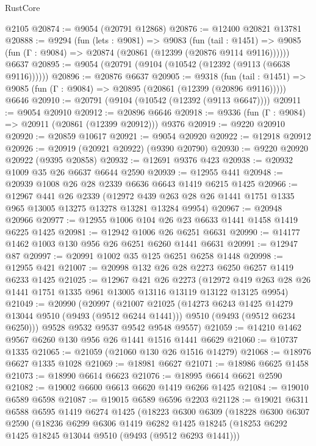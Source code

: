 \begin{lexlean}{RustCore}
\begin{coremodule}
    @2105
@20874 := @9054 (@20791 @12868)
@20876 := @12400 @20821 @13781
@20888 := @9294
    (fun (lets : @9081) =>
    @9083
      (fun (tail : @1451) =>
      @9085 (fun (Γ : @9084) => @20874 (@20861 (@12399 (@20876 @9114 @9116))))))
    @6637
@20895 := @9054 (@20791 (@9104 (@10542 (@12392 (@9113 (@6638 @9116))))))
@20896 := @20876 @6637
@20905 := @9318
    (fun (tail : @1451) => @9085 (fun (Γ : @9084) => @20895 (@20861 (@12399 (@20896 @9116)))))
    @6646
@20910 := @20791 (@9104 (@10542 (@12392 (@9113 @6647))))
@20911 := @9054 @20910
@20912 := @20896 @6646
@20918 := @9336 (fun (Γ : @9084) => @20911 (@20861 (@12399 @20912))) @9376
@20919 := @9220 @20910
@20920 := @20859 @10617
@20921 := @9054 @20920
@20922 := @12918 @20912
@20926 := @20919 (@20921 @20922) (@9390 @20790)
@20930 := @9220 @20920 @20922 (@9395 @20858)
@20932 := @12691 @9376 @423
@20938 := @20932 @1009 @35 @26 @6637 @6644 @2590
@20939 := @12955 @441
@20948 := @20939 @1008 @26 @28 @2339 @6636 @6643 @1419 @6215 @1425
@20966 := @12967
    @441
    @26
    @2339
    (@12972 @439 @263 @28 @26 @1441 @1751 @1335 @965 @13005 @13275 @13278 @13281 @13284 @9954)
@20967 := @20948 @20966
@20977 := @12955 @1006 @104 @26 @23 @6633 @1441 @1458 @1419 @6225 @1425
@20981 := @12942 @1006 @26 @6251 @6631
@20990 := @14177 @1462 @1003 @130 @956 @26 @6251 @6260 @1441 @6631
@20991 := @12947 @87
@20997 := @20991 @1002 @35 @125 @6251 @6258 @1448
@20998 := @12955 @421
@21007 := @20998 @132 @26 @28 @2273 @6250 @6257 @1419 @6233 @1425
@21025 := @12967
    @421
    @26
    @2273
    (@12972 @419 @263 @28 @26 @1441 @1751 @1335 @961 @13005 @13116 @13119 @13122 @13125 @9954)
@21049 := @20990
    (@20997
      (@21007
        @21025
        (@14273 @6243 @1425 @14279 @13044 @9510 (@9493 (@9512 @6244 @1441)))
        @9510
        (@9493 (@9512 @6234 @6250)))
      @9528
      @9532
      @9537
      @9542
      @9548
      @9557)
@21059 := @14210 @1462 @9567 @6260 @130 @956 @26 @1441 @1516 @1441 @6629
@21060 := @10737 @1335
@21065 := @21059 (@21060 @130 @26 @1516 @14279)
@21068 := @18976 @6627 @1335 @1028
@21069 := @18981 @6627
@21071 := @18986 @6625 @1458
@21073 := @18990 @6614 @6623
@21076 := @18995 @6614 @6621 @2590
@21082 := @19002 @6600 @6613 @6620 @1419 @6266 @1425
@21084 := @19010 @6589 @6598
@21087 := @19015 @6589 @6596 @2203
@21128 := @19021
    @6311
    @6588
    @6595
    @1419
    @6274
    @1425
    (@18223
      @6300
      @6309
      (@18228
        @6300
        @6307
        @2590
        (@18236
          @6299
          @6306
          @1419
          @6282
          @1425
          @18245
          (@18253 @6292 @1425 @18245 @13044 @9510 (@9493 (@9512 @6293 @1441)))

\end{coremodule}
\end{lexlean}
